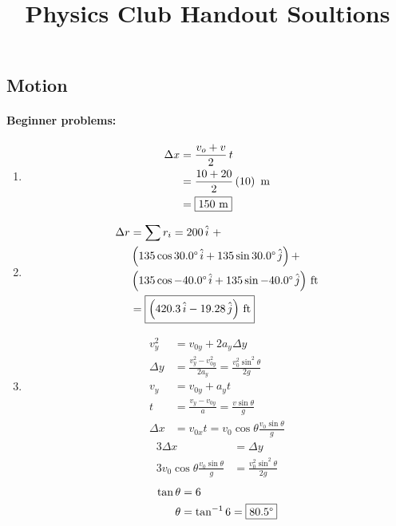 \documentclass[12pt,letterpaper]{article}
\title{Physics Club Handout Soultions}
\begin{document}
\begin{multicols}{2}
\section{Motion}

\paragraph{Beginner problems:}
\begin{enumerate}
\item \[
\begin{aligned}
\Delta x &= \frac{v_o+v}{2}\,t\\
         &= \frac{10+20}{2}\left(10\right)\ \text{m}\\
         &= \fbox{150 m}
\end{aligned}
\]

\item \[
\begin{aligned}
\Delta r &= \sum r_i = 200\,\hat{i}\ +\\
         &  \left(135\cos{30.0\degree}\,\hat{i} + 135\sin{30.0\degree}\,\hat{j}\right) +\\
         &  \left(135\cos{-40.0\degree}\,\hat{i} + 135\sin{-40.0\degree}\,\hat{j}\right)\,\text{ft}\\
         &= \fbox{$\left(420.3\,\hat{i} - 19.28\,\hat{j}\right)$ ft}
\end{aligned}
\]

\item \[
\begin{aligned}
v_y^2&=v_{0y}+2a_y\Delta y\\
\Delta y&=\frac{v_y^2-v_{0y}^2}{2a_y}=\frac{v_0^2\sin^2 \theta}{2g}\\
v_y&=v_{0y}+a_yt\\
t&=\frac{v_y-v_{0y}}{a}=\frac{v\sin \theta}{g}\\
\Delta x &= v_{0x}t = v_0\cos \theta \frac{v_0\sin \theta}{g}
\end{aligned}
\] \[
\begin{aligned}
3 \Delta x &= \Delta y\\
3 v_0\cos \theta \frac{v_0\sin \theta}{g} &= \frac{v_0^2\sin^2 \theta}{2g}
\end{aligned}
\] \[
\begin{aligned}
\tan \theta &= 6\\
\theta &= \tan^{-1} 6 = \fbox{80.5$\degree$}
\end{aligned}
\]


\end{enumerate}
\end{multicols}
\end{document}

